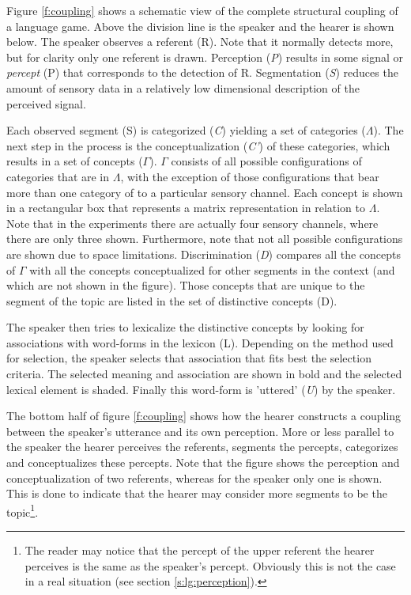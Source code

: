 \p
Figure \ref{f:coupling} shows a schematic view of the complete structural coupling of a language game. Above the division line is the speaker and the hearer is shown below. The speaker observes a referent (R). Note that it normally detects more, but for clarity only one referent is drawn. Perception ({\it P}) results in some signal or {\em percept} (P) that corresponds to the detection of R. Segmentation ({\it S}) reduces the amount of sensory data in a relatively low dimensional description of the perceived signal.

Each observed segment (S) is categorized ({\it C}) yielding a set of categories ($\Lambda$). The next step in the process is the conceptualization ({\it C'}) of these categories, which results in a set of concepts ($\Gamma$). $\Gamma$ consists of all possible configurations of categories that are in $\Lambda$, with the exception of those configurations that bear more than one category of to a particular sensory channel. Each concept is shown in a rectangular box that represents a matrix representation in relation to $\Lambda$.  Note that in the experiments there are actually four sensory channels, where there are only three shown. Furthermore, note that not all possible configurations are shown due to space limitations. Discrimination ({\it D}) compares all the concepts of $\Gamma$ with all the concepts conceptualized for other segments in the context (and which are not shown in the figure). Those concepts that are unique to the segment of the topic are listed in the set of distinctive concepts (D).

The speaker then tries to lexicalize the distinctive concepts by looking for associations with word-forms in the lexicon (L). Depending on the method used for selection, the speaker selects that association that fits best the selection criteria. The selected meaning and association are shown in bold and the selected lexical element is shaded. Finally this word-form is 'uttered' ({\it U}) by the speaker.

\p
The bottom half of figure \ref{f:coupling} shows how the hearer constructs a coupling between the speaker's utterance and its own perception. More or less parallel to the speaker the hearer perceives the referents, segments the percepts, categorizes and conceptualizes these percepts. Note that the figure shows the perception and conceptualization of two referents, whereas for the speaker only one is shown. This is done to indicate that the hearer may consider more segments to be the topic\footnote{The reader may notice that the percept of the upper referent the hearer perceives is the same as the speaker's percept. Obviously this is not the case in a real situation (see section \ref{s:lg:perception}).}.

